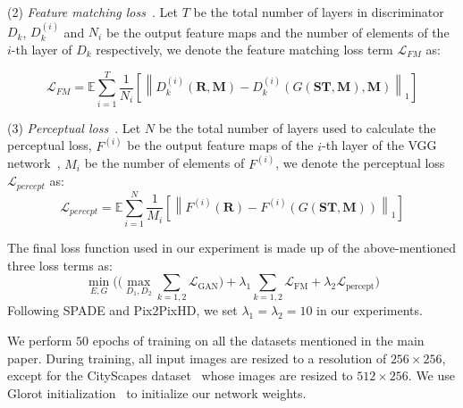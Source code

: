 \documentclass[10pt,twocolumn,letterpaper]{article}
\begin{document}
\noindent (2) \textit{Feature matching loss}~\cite{wang2018pix2pixHD}. Let $T$ be the total number of layers in discriminator $D_{k}$, $D_{k}^{(i)}$ and $N_{i}$ be the output feature maps and the number of elements of the $i$-th layer of $D_{k}$ respectively, we denote the feature matching loss term $\mathcal{L}_{FM}$ as:

\small
\begin{equation}
\mathcal{L}_{FM}=\mathbb{E} \sum_{i=1}^{T}\frac{1}{N_{i}}\left[\left\|D_{k}^{(i)}(\mathbf{R} ,\mathbf{M})-D_{k}^{(i)}\left(G\mathbf{(ST,M)},\mathbf{M}\right)\right\|_{1}\right]
\label{eq:feature matching loss function}
\end{equation}
\normalsize

\noindent (3) \textit{Perceptual loss}~\cite{johnson2016perceptual}. Let $N$ be the total number of layers used to calculate the perceptual loss, $F^{(i)}$ be the output feature maps of the $i$-th layer of the VGG network~\cite{simonyan2014deep}, $M_{i}$ be the number of elements of $F^{(i)}$, we denote the perceptual loss $\mathcal{L}_{p e r c e p t}$ as:
\small
\begin{equation}
\mathcal{L}_{p e r c e p t}=\mathbb{E}\sum_{i=1}^{N} \frac{1}{M_{i}}\left[\left\|F^{(i)}\left(\mathbf{R}\right)-F^{(i)}\left(G\mathbf{(ST,M)}\right)\right\|_{1}\right]
\label{eq:perceptual loss function}
\end{equation}
\normalsize




The final loss function used in our experiment is made up of the above-mentioned three loss terms as: 
\small
\begin{equation}
\min_{E, G}\bigg( \Big( \max _{D_{1}, D_{2}} \sum_{k=1,2} \mathcal{L}_{\mathrm{GAN}} \Big) + \lambda_{1} \sum_{k=1,2} \mathcal{L}_{\mathrm{FM}} + \lambda_{2} \mathcal{L}_{\mathrm{p e r c e p t}}\bigg) 
\label{eq:overall loss}
\end{equation}
\normalsize
Following SPADE and Pix2PixHD, we set $\lambda_{1} = \lambda_{2} = 10$ in our experiments.




\vspace*{3mm} We perform $50$ epochs of training on all the datasets mentioned in the main paper. During training, all input images are resized to a resolution of $256\times256$, except for the CityScapes dataset~\cite{Cordts2016Cityscapes} whose images are resized to $512\times256$. We use Glorot initialization~\cite{pmlr-v9-glorot10a} to initialize our network weights.
\end{document}
